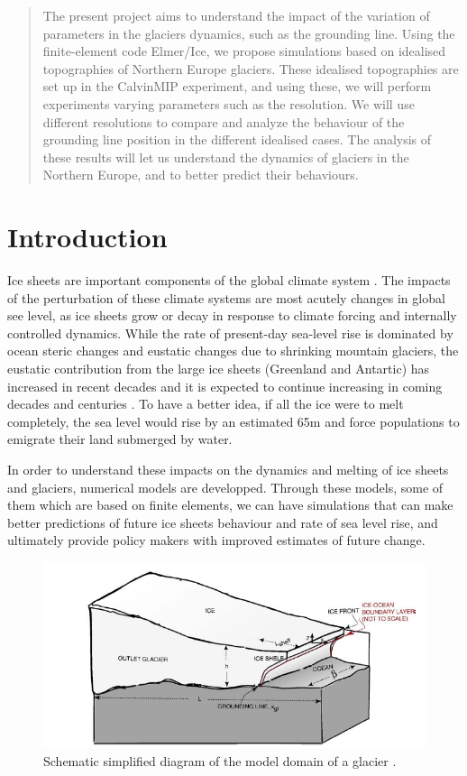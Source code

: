 \documentclass[a4paper,12pt]{article}
\begin{document}
\tableofcontents

\newpage
\begin{abstract}
	\justifying

	The present project aims to understand the impact of the variation of parameters in the glaciers dynamics, such as the grounding line. Using the finite-element code Elmer/Ice, we propose simulations based on idealised topographies of Northern Europe glaciers. These idealised topographies are set up in the CalvinMIP experiment, and using these, we will perform experiments varying parameters such as the resolution. We will use different resolutions to compare and analyze the behaviour of the grounding line position in the different idealised cases. The analysis of these results will let us understand the dynamics of glaciers in the Northern Europe, and to better predict their behaviours.
\end{abstract}
\pagebreak

\section{Introduction}
\justifying
Ice sheets are important components of the global climate system \cite[]{zhang2017comparison}. The impacts of the perturbation of these climate systems are most acutely changes in global see level, as ice sheets grow or decay in response to climate forcing and internally controlled dynamics. While the rate of present-day sea-level rise is dominated by ocean steric changes and eustatic changes due to shrinking mountain glaciers, the eustatic contribution from the large ice sheets (Greenland and Antartic) has increased in recent decades and it is expected to continue increasing in coming decades and centuries \cite[]{clark2015recent}. To have a better idea, if all the ice were to melt completely, the sea level would rise by an estimated 65m \cite[]{morlighem2017bedmachine,haywood2011pliocene} and force populations to emigrate their land submerged by water.

In order to understand these impacts on the dynamics and melting of ice sheets and glaciers, numerical models are developped. Through these models, some of them which are based on finite elements, we can have simulations that can make better predictions of future ice sheets behaviour and rate of sea level rise, and ultimately provide policy makers with improved estimates of future change.

\begin{figure}[!h]
	\centering
	\includegraphics[width=0.7\linewidth]{../fig/Scheme_grounding_line}
	\caption{Schematic simplified diagram of the model domain of a glacier \cite[]{parizek2010implications}.}
	\label{groundingline}
\end{figure}
\end{document}
